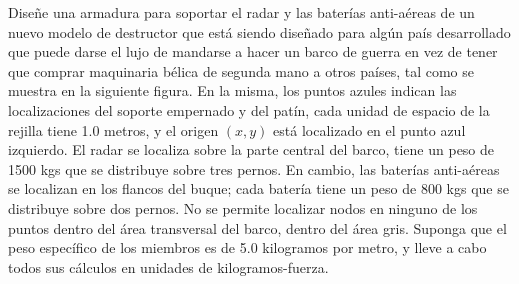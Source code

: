 \documentclass[ a4paper, twoside, 11pt]{article}
\begin{document}
\begin{problem}

Dise\~ne una armadura para soportar el radar y las bater\'ias anti-a\'ereas de un nuevo modelo de destructor que est\'a siendo dise\~nado para alg\'un pa\'is desarrollado que puede darse el lujo de mandarse a hacer un barco de guerra en vez de tener que comprar maquinaria b\'elica de segunda mano a otros pa\'ises, tal como se muestra en la siguiente figura. En la misma, los puntos azules indican las localizaciones del soporte empernado y del pat\'in, cada unidad de espacio de la rejilla tiene 1.0 metros, y el origen $(x,y)$ est\'a localizado en el punto azul izquierdo. El radar se localiza sobre la parte central del barco, tiene un peso de 1500 kgs que se distribuye sobre tres pernos. En cambio, las bater\'ias anti-a\'ereas se localizan en los flancos del buque; cada bater\'ia tiene un peso de 800 kgs que se distribuye sobre dos pernos. No se permite localizar nodos en ninguno de los puntos dentro del \'area transversal del barco, \ie dentro del \'area gris. Suponga que el peso espec\'ifico de los miembros es de 5.0 kilogramos por metro, y lleve a cabo todos sus c\'alculos en unidades de kilogramos-fuerza. 
\fullskip

\begin{figure}[htb]
\centering
\def\svgwidth{0.5\columnwidth}

\end{figure}
\halfskip

\end{problem}
\fullskip
\end{document}
